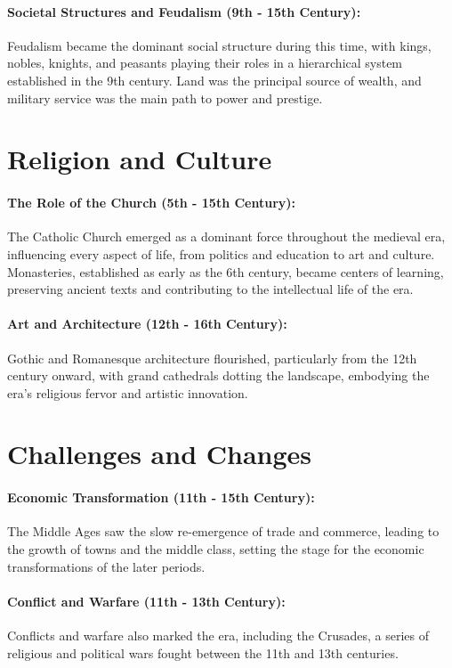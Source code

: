 \documentclass[a4paper,12pt]{book}
\begin{document}
\paragraph{Societal Structures and Feudalism (9th - 15th Century):}
Feudalism became the dominant social structure during this time, with kings, nobles, knights, and peasants playing their roles in a hierarchical system established in the 9th century. Land was the principal source of wealth, and military service was the main path to power and prestige.

\section*{Religion and Culture}

\paragraph{The Role of the Church (5th - 15th Century):}
The Catholic Church emerged as a dominant force throughout the medieval era, influencing every aspect of life, from politics and education to art and culture. Monasteries, established as early as the 6th century, became centers of learning, preserving ancient texts and contributing to the intellectual life of the era.

\paragraph{Art and Architecture (12th - 16th Century):}
Gothic and Romanesque architecture flourished, particularly from the 12th century onward, with grand cathedrals dotting the landscape, embodying the era’s religious fervor and artistic innovation.

\section*{Challenges and Changes}

\paragraph{Economic Transformation (11th - 15th Century):}
The Middle Ages saw the slow re-emergence of trade and commerce, leading to the growth of towns and the middle class, setting the stage for the economic transformations of the later periods.

\paragraph{Conflict and Warfare (11th - 13th Century):}
Conflicts and warfare also marked the era, including the Crusades, a series of religious and political wars fought between the 11th and 13th centuries.
\end{document}
